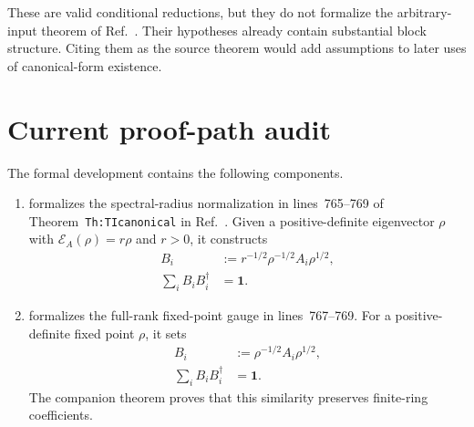 \documentclass{article}
\begin{document}
These are valid conditional reductions, but they do not formalize the
arbitrary-input theorem of Ref.~\cite{PerezGarcia2007MPSReps}. Their
hypotheses already contain substantial block structure. Citing them as the
source theorem would add assumptions to later uses of canonical-form
existence.

\section{Current proof-path audit}
\label{sec:pgvwc07_ti_canonical_form_scope_current_proof_path_audit}

The formal development contains the following components.

\begin{enumerate}
    \item
          formalizes the spectral-radius normalization in lines~765--769 of
          Theorem~\texttt{Th:TIcanonical} in
          Ref.~\cite{PerezGarcia2007MPSReps}. Given a positive-definite
          eigenvector $\rho$ with $\mathcal{E}_A(\rho)=r\rho$ and $r>0$, it
          constructs
          \begin{align}
              B_i
                  &:= r^{-1/2}\rho^{-1/2}A_i\rho^{1/2},
              \label{eq:pgvwc07_ti_canonical_form_scope_spectral_unital_gauge}\\
              \sum_i B_iB_i^\dagger
                  &= \mathbf{1}.
              \label{eq:pgvwc07_ti_canonical_form_scope_spectral_unital_result}
          \end{align}

    \item
          formalizes the full-rank fixed-point gauge in lines~767--769. For a
          positive-definite fixed point $\rho$, it sets
          \begin{align}
              B_i
                  &:= \rho^{-1/2}A_i\rho^{1/2},
              \label{eq:pgvwc07_ti_canonical_form_scope_unital_fixed_point_gauge}\\
              \sum_i B_iB_i^\dagger
                  &= \mathbf{1}.
              \label{eq:pgvwc07_ti_canonical_form_scope_unital_fixed_point_result}
          \end{align}
          The companion theorem 
          proves that this similarity preserves finite-ring coefficients.


\end{enumerate}
\end{document}
